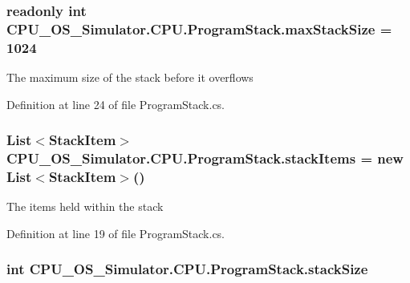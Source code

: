 \subsubsection[{max\+Stack\+Size}]{\setlength{\rightskip}{0pt plus 5cm}readonly int C\+P\+U\+\_\+\+O\+S\+\_\+\+Simulator.\+C\+P\+U.\+Program\+Stack.\+max\+Stack\+Size = 1024\hspace{0.3cm}{\ttfamily [private]}}\label{class_c_p_u___o_s___simulator_1_1_c_p_u_1_1_program_stack_a2e475bb3c8ce48b8b0a86e31b2cb972e}


The maximum size of the stack before it overflows 



Definition at line 24 of file Program\+Stack.\+cs.

\hypertarget{class_c_p_u___o_s___simulator_1_1_c_p_u_1_1_program_stack_ada087487ee69e4e38e2f2591bdc28f37}{}
\subsubsection[{stack\+Items}]{\setlength{\rightskip}{0pt plus 5cm}List$<${\bf Stack\+Item}$>$ C\+P\+U\+\_\+\+O\+S\+\_\+\+Simulator.\+C\+P\+U.\+Program\+Stack.\+stack\+Items = new List$<${\bf Stack\+Item}$>$()\hspace{0.3cm}{\ttfamily [private]}}\label{class_c_p_u___o_s___simulator_1_1_c_p_u_1_1_program_stack_ada087487ee69e4e38e2f2591bdc28f37}


The items held within the stack 



Definition at line 19 of file Program\+Stack.\+cs.

\hypertarget{class_c_p_u___o_s___simulator_1_1_c_p_u_1_1_program_stack_ab0667a30e4d6e10c3ffddfdfbc084102}{}
\subsubsection[{stack\+Size}]{\setlength{\rightskip}{0pt plus 5cm}int C\+P\+U\+\_\+\+O\+S\+\_\+\+Simulator.\+C\+P\+U.\+Program\+Stack.\+stack\+Size\hspace{0.3cm}{\ttfamily [private]}}\label{class_c_p_u___o_s___simulator_1_1_c_p_u_1_1_program_stack_ab0667a30e4d6e10c3ffddfdfbc084102}


